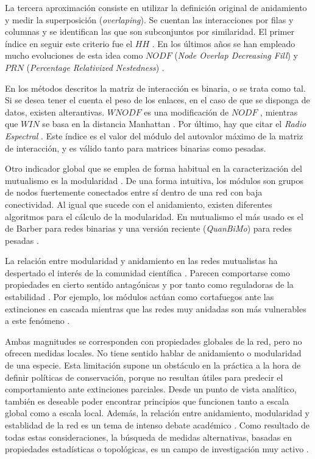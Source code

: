La tercera aproximación consiste en utilizar la definición original de anidamiento y medir la superposición (\textit{overlaping}). Se cuentan las interacciones por filas y columnas y se identifican las que son subconjuntos por similaridad. El primer índice en seguir este criterio fue el $HH$ \cite{hausdorf2003nestedness}. En los últimos años se han empleado mucho evoluciones de esta idea como $NODF$ (\textit{Node Overlap Decreasing Fill}) \cite{almeida2008consistent} y $PRN$ (\textit{Percentage Relativized Nestedness}) \cite{podani2012comparative}.

En los métodos descritos la matriz de interacción es binaria, o se trata como tal. Si se desea tener el cuenta el peso de los enlaces, en el
caso de que se disponga de datos, existen alterantivas. $WNODF$ es una modificación de $NODF$ \cite{almeida2011straightforward}, mientras que $WIN$ se basa en la distancia Manhattan \cite{galeano2009weighted}. Por último, hay que citar el \textit{Radio Espectral} \cite{staniczenko2013ghost}. Este índice es el valor del módulo del autovalor máximo de la matriz de interacción, y es válido tanto para matrices binarias como pesadas. 

Otro indicador global que se emplea de forma habitual en la caracterización del mutualismo es la modularidad \cite{newman2004finding, olesen2007modularity}. De una forma intuitiva, los módulos son grupos de nodos fuertemente conectados entre sí dentro de una red con baja conectividad.
Al igual que sucede con el anidamiento, existen diferentes algoritmos para el cálculo de la modularidad. En mutualismo el
más usado es el de Barber para redes binarias \cite{barber2007modularity} y una versión reciente (\textit{QuanBiMo}) para redes pesadas \cite{dormann2014method}.

La relación entre modularidad y anidamiento en las redes mutualistas ha despertado el interés de la comunidad científica \cite{olesen2007modularity, dupont2009ecological}. Parecen comportarse como propiedades en cierto sentido antagónicas y por tanto como reguladoras de la estabilidad \cite{fortuna2010nestedness}. Por ejemplo, los módulos actúan como cortafuegos ante las extinciones en cascada \cite{saavedra2011strong} mientras que las redes muy anidadas son más vulnerables a este fenómeno \cite{lever2014sudden}. 

Ambas magnitudes se corresponden con propiedades globales de la red, pero no ofrecen medidas locales. No tiene sentido hablar de anidamiento o modularidad de una especie. Esta limitación supone un obstáculo en la práctica a la hora de definir políticas de conservación, porque no resultan útiles para predecir el comportamiento ante extinciones parciales. Desde un punto de vista analítico, también es deseable poder encontrar principios que funcionen tanto a escala global como a escala local. 
Además, la relación entre anidamiento, modularidad y establidad de la red es un tema de intenso debate académico \cite{fortuna2010nestedness, james2012disentangling, staniczenko2013ghost, feng2014heterogeneity}. Como resultado de todas estas consideraciones, la búsqueda de medidas alternativas, basadas en propiedades estadísticas o topológicas, es un campo de investigación muy activo \cite{podani2014new,chagnon2015characterizing,strona2015new}.

